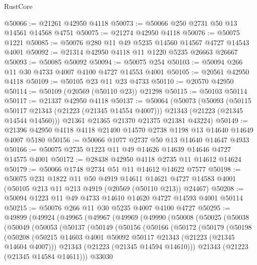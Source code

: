 \begin{lexlean}{RustCore}
\begin{coremodule}
@50066 := @21261 @42950 @4118
@50073 := @50066 @250 @2731 @50 @13 @14561 @14568 @4751
@50075 := @21274 @42950 @4118
@50076 := @50075 @1221
@50085 := @50076 @280 @11 @49 @5235 @14560 @14567 @4727 @14543 @4001
@50092 := @21314 @42950 @4118 @11 @1220 @5235 @26663 @26667
@50093 := @50085 @50092
@50094 := @50075 @254
@50103 := @50094 @266 @11 @30 @4733 @4007 @4100 @4727 @14553 @4001
@50105 := @20561 @42950 @4118
@50109 := @50105 @23 @11 @23 @4733
@50110 := @20570 @42950
@50114 := @50109 (@20569 (@50110 @23)) @21298
@50115 := @50103 @50114
@50117 := @21337 @42950 @4118
@50137 := @50064
    (@50073
      (@50093
        (@50115 @50117 @21343 (@21223 (@21345 @14554 @4007)))
        @21343
        (@21223 (@21345 @14544 @14560)))
      @21361
      @21365
      @21370
      @21375
      @21381
      @43224)
@50149 := @21396 @42950 @4118 @4118 @21400 @14570 @2738 @1198 @13 @14640 @14649 @4007 @5180
@50156 := @50066 @1077 @2737 @50 @13 @14640 @14647 @4933
@50166 := @50075 @2735 @1223 @11 @49 @14626 @14639 @14646 @4727 @14575 @4001
@50172 := @28438 @42950 @4118 @2735 @11 @14612 @14624
@50179 := @50066 @1748 @2734 @51 @11 @14612 @14622 @7577
@50198 := @50075
    @231
    @1822
    @11
    @50
    @4919
    @14611
    @14621
    @4727
    @14583
    @4001
    (@50105 @213 @11 @213 @4919 (@20569 (@50110 @213)) @24467)
@50208 := @50094 @1223 @11 @49 @4733 @14610 @14620 @4727 @14593 @4001 @50114
@50215 := @50076 @266 @11 @30 @5235 @4007 @4100 @4727
@50295 := @49899
    (@49924
      (@49965
        (@49967
          (@49969
            (@49990
              (@50008
                (@50025
                  (@50038
                    (@50049
                      (@50053
                        (@50137
                          (@50149
                            (@50156
                              (@50166
                                (@50172
                                  (@50179
                                    (@50198
                                      (@50208
                                        (@50215
                                          @14603
                                          @4001
                                          @50092
                                          @50117
                                          @21343
                                          (@21223 (@21345 @14604 @4007)))
                                        @21343
                                        (@21223 (@21345 @14594 @14610)))
                                      @21343
                                      (@21223 (@21345 @14584 @14611)))
                                    @33030

\end{coremodule}
\end{lexlean}
